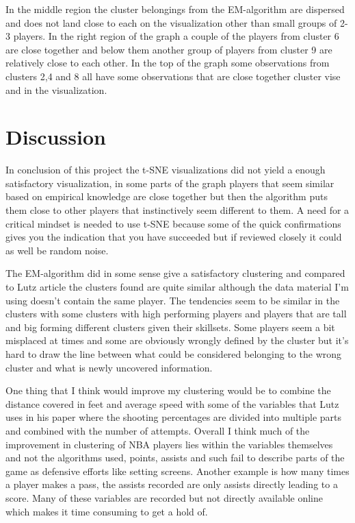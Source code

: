 \documentclass{article}
\begin{document}
In the middle region the cluster belongings from the EM-algorithm are dispersed and does not land close to each on the visualization other than small groups of 2-3 players. In the right region of the graph a couple of the players from cluster 6 are close together and below them another group of players from cluster 9 are relatively close to each other. In the top of the graph some observations from clusters 2,4 and 8 all have some observations that are close together cluster vise and in the visualization.


\newpage

\section{Discussion}

In conclusion of this project the t-SNE visualizations did not yield a enough satisfactory visualization, in some parts of the graph players that seem similar based on empirical knowledge are close together but then the algorithm puts them close to other players that instinctively seem different to them. A need for a critical mindset is needed to use t-SNE because some of the quick confirmations gives you the indication that you have succeeded but if reviewed closely it could as well be random noise.

The EM-algorithm did in some sense give a satisfactory clustering and compared to Lutz article the clusters found are quite similar although the data material I’m using doesn’t contain the same player. The tendencies seem to be similar in the clusters with some clusters with high performing players and players that are tall and big forming different clusters given their skillsets. Some players seem a bit misplaced at times and some are obviously wrongly defined by the cluster but it’s hard to draw the line between what could be considered belonging to the wrong cluster and what is newly uncovered information.

One thing that I think would improve my clustering would be to combine the distance covered in feet and average speed with some of the variables that Lutz uses in his paper where the shooting percentages are divided into multiple parts and combined with the number of attempts. Overall I think much of the improvement in clustering of NBA players lies within the variables themselves and not the algorithms used, points, assists and such fail to describe parts of the game as defensive efforts like setting screens. Another example is how many times a player makes a pass, the assists recorded are only assists directly leading to a score. Many of these variables are recorded but not directly available online which makes it time consuming to get a hold of.
\end{document}
